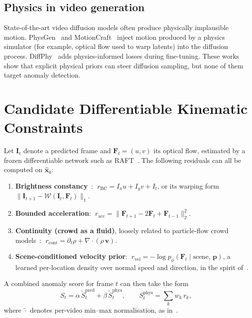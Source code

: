 \documentclass[11pt,a4paper]{article}
\begin{document}
\subsection{Physics in video generation}
State-of-the-art video diffusion models often produce physically implausible motion. PhysGen~\cite{liu2024physgen} and MotionCraft~\cite{aira2024motioncraft} inject motion produced by a physics simulator (for example, optical flow used to warp latents) into the diffusion process. DiffPhy~\cite{zhang2025diffphy} adds physics-informed losses during fine-tuning. These works show that explicit physical priors can steer diffusion sampling, but none of them target anomaly detection.

\section{Candidate Differentiable Kinematic Constraints}
\label{sec:constraints}
Let $\mathbf{I}_t$ denote a predicted frame and $\mathbf{F}_t=(u,v)$ its optical flow, estimated by a frozen differentiable network such as RAFT~\cite{teed2020raft}. The following residuals can all be computed on $\hat{\mathbf{x}}_0$:
\begin{enumerate}[label=(\alph*)]
  \item \textbf{Brightness constancy}~\cite{horn1981determining}: $\;r_{\text{BC}}=I_x u+I_y v+I_t$, or its warping form $\|\mathbf{I}_{t+1}-\mathcal{W}(\mathbf{I}_t,\mathbf{F}_t)\|_1$.
  \item \textbf{Bounded acceleration}: $\;r_{\text{acc}}=\|\mathbf{F}_{t+1}-2\mathbf{F}_t+\mathbf{F}_{t-1}\|_2^2$.
  \item \textbf{Continuity (crowd as a fluid)}, loosely related to particle-flow crowd models~\cite{mehran2009abnormal}: $\;r_{\text{cont}}=\partial_t\rho+\nabla\!\cdot(\rho\,\mathbf{v})$.
  \item \textbf{Scene-conditioned velocity prior}: $\;r_{\text{vel}}=-\log p_{\phi}(\mathbf{F}_t\mid\text{scene},\,\mathbf{p})$, a learned per-location density over normal speed and direction, in the spirit of~\cite{reiss2022attribute}.
\end{enumerate}
A combined anomaly score for frame $t$ can then take the form
\begin{equation}
S_t=\alpha\,\tilde{S}^{\text{pred}}_t+\beta\,\tilde{S}^{\text{phys}}_t,\qquad
S^{\text{phys}}_t=\textstyle\sum_k w_k\,r_k ,
\label{eq:score}
\end{equation}
where $\tilde{\cdot}$ denotes per-video min--max normalisation, as in~\cite{liu2018future}.
\end{document}

